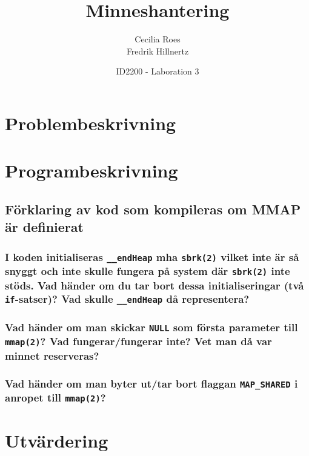 \documentclass[a4paper]{article}
\title{Minneshantering}
\date{ID2200 - Laboration 3}
\author{Cecilia Roes \\ Fredrik Hillnertz}
\begin{document}

\maketitle

\section*{Problembeskrivning}

\section*{Programbeskrivning}

\subsection*{Förklaring av kod som kompileras om MMAP är definierat}

\subsubsection*{I koden initialiseras \texttt{\_\_endHeap} mha \texttt{sbrk(2)} vilket inte är så snyggt och inte skulle fungera på system där \texttt{sbrk(2)} inte stöds. Vad händer om du tar bort dessa initialiseringar (två \texttt{if}-satser)? Vad skulle \texttt{\_\_endHeap} då representera?}

\subsubsection*{Vad händer om man skickar \texttt{NULL} som första parameter till \texttt{mmap(2)}? Vad fungerar/fungerar inte? Vet man då var minnet reserveras?}

\subsubsection*{Vad händer om man byter ut/tar bort flaggan \texttt{MAP\_SHARED} i anropet till \texttt{mmap(2)}?}

\section*{Utvärdering}

\end{document}
